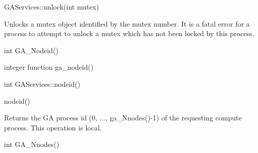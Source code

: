 \documentclass[12pt]{article}
\begin{document}
\begin{cxxapi}
\begin{cxxcode}
GAServices::unlock(int mutex)
\end{cxxcode}
\begin{funcargs}
\end{funcargs}
\end{cxxapi}
\ncoll

\begin{desc}

Unlocks a mutex object identified by the mutex number. It is a fatal
error for a process to attempt to unlock a mutex which has not been
locked by this process.
\end{desc}


\begin{capi}
\begin{ccode}
int GA_Nodeid()
\end{ccode}
\end{capi}

\begin{fapi}
\begin{fcode}
integer function ga_nodeid()
\end{fcode}
\end{fapi}

\begin{cxxapi}
\begin{cxxcode}
int GAServices::nodeid()
\end{cxxcode}
\end{cxxapi}

\begin{pyapi}
\begin{pycode}
nodeid()
\end{pycode}
\end{pyapi}

\local
\begin{desc}

Returns the GA process id (0, ..., ga_Nnodes()-1) of the requesting compute process.
This operation is local.
\end{desc}


\begin{capi}
\begin{ccode}
int GA_Nnodes()
\end{ccode}
\end{capi}
\end{document}
